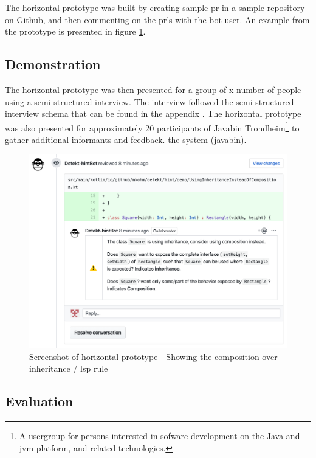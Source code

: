 \documentclass{report}
\begin{document}
The horizontal prototype was built by creating sample \gls{pr} in a sample repository on Github\cite{sample-repository}, and then commenting on the \gls{pr}'s with the bot user. An example from the prototype is presented in figure \ref{fig:liskov}.

\subsection*{Demonstration}
The horizontal prototype was then presented for a group of x number of people using a semi structured interview. The interview followed the semi-structured interview schema that can be found in the appendix \cite{}. The horizontal prototype was also presented for approximately 20 participants of Javabin Trondheim\footnote{A usergroup for persons interested in sofware development on the Java and \gls{jvm} platform, and related technologies.} to gather additional informants and feedback. the system (javabin). 


\begin{figure}[h!]
    \centering
    \includegraphics[width=\textwidth]{../images/demo.png}
    \caption{Screenshot of horizontal prototype - Showing the composition over inheritance / \gls{lsp} rule}
    \label{fig:liskov}
\end{figure}



\subsection*{Evaluation}
\end{document}

